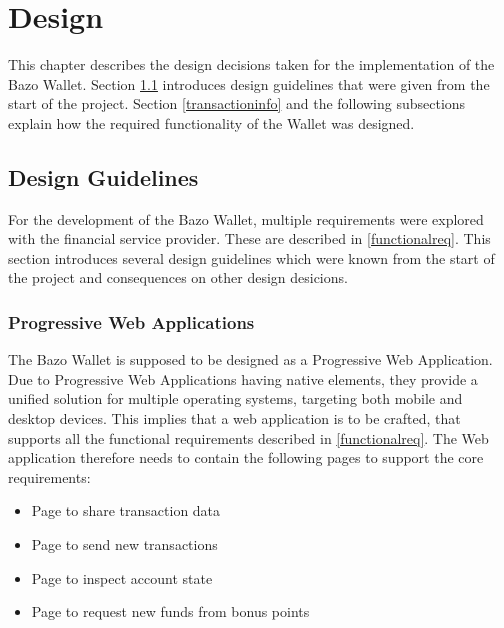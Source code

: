 \chapter{Design}
This chapter describes the design decisions taken for the implementation of the Bazo Wallet. Section \ref{designguide} introduces design guidelines that were given from the start of the project. Section \ref{transactioninfo} and the following subsections explain how the required functionality of the Wallet was designed.
\section{Design Guidelines}\label{designguide}
For the development of the Bazo Wallet, multiple requirements were explored with the financial service provider. These are described in \ref{functionalreq}. This section introduces several design guidelines which were known from the start of the project and consequences on other design desicions.
\subsection{Progressive Web Applications}
The Bazo Wallet is supposed to be designed as a Progressive Web Application. Due to Progressive Web Applications having native elements, they provide a unified solution for multiple operating systems, targeting both mobile and desktop devices. This implies that a web application is to be crafted, that supports all the functional requirements described in \ref{functionalreq}. The Web application therefore needs to contain the following pages to support the core requirements:
\begin{itemize}
\item Page to share transaction data
\item Page to send new transactions
\item Page to inspect account state
\item Page to request new funds from bonus points
\end{itemize}

